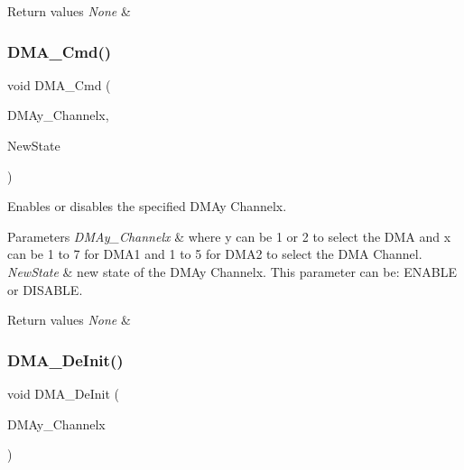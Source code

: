 \begin{DoxyRetVals}{Return values}
{\em None} & \\
\hline
\end{DoxyRetVals}
\mbox{\label{group___d_m_a___exported___functions_ga8e7cb6b9ae5f142e2961df879cdaba65}} 
\subsubsection{\texorpdfstring{DMA\_Cmd()}{DMA\_Cmd()}}
{\footnotesize\ttfamily void D\+M\+A\+\_\+\+Cmd (\begin{DoxyParamCaption}\item[{\mbox{\hyperlink{struct_d_m_a___channel___type_def}{D\+M\+A\+\_\+\+Channel\+\_\+\+Type\+Def}} $\ast$}]{D\+M\+Ay\+\_\+\+Channelx,  }\item[{\mbox{\hyperlink{group___exported__types_gac9a7e9a35d2513ec15c3b537aaa4fba1}{Functional\+State}}}]{New\+State }\end{DoxyParamCaption})}



Enables or disables the specified D\+M\+Ay Channelx. 


\begin{DoxyParams}{Parameters}
{\em D\+M\+Ay\+\_\+\+Channelx} & where y can be 1 or 2 to select the D\+MA and x can be 1 to 7 for D\+M\+A1 and 1 to 5 for D\+M\+A2 to select the D\+MA Channel. \\
\hline
{\em New\+State} & new state of the D\+M\+Ay Channelx. This parameter can be\+: E\+N\+A\+B\+LE or D\+I\+S\+A\+B\+LE. \\
\hline
\end{DoxyParams}

\begin{DoxyRetVals}{Return values}
{\em None} & \\
\hline
\end{DoxyRetVals}
\mbox{\label{group___d_m_a___exported___functions_ga21ca0d50b13e502db5ab5feb484f9ece}} 
\subsubsection{\texorpdfstring{DMA\_DeInit()}{DMA\_DeInit()}}
{\footnotesize\ttfamily void D\+M\+A\+\_\+\+De\+Init (\begin{DoxyParamCaption}\item[{\mbox{\hyperlink{struct_d_m_a___channel___type_def}{D\+M\+A\+\_\+\+Channel\+\_\+\+Type\+Def}} $\ast$}]{D\+M\+Ay\+\_\+\+Channelx }\end{DoxyParamCaption})}



